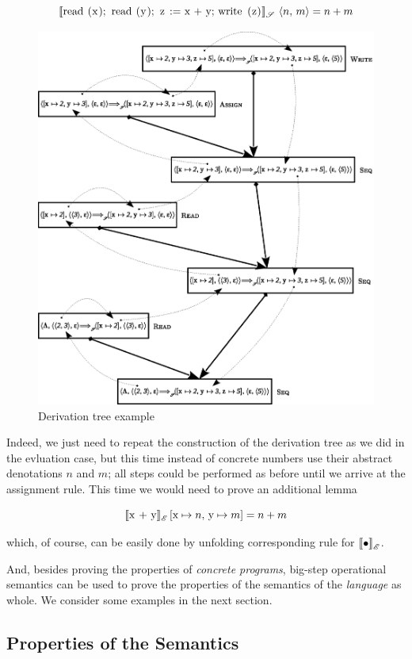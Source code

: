 \[
\sembr{\llang{read (x); read (y); z := x + y; write (z)}}^\ph_\mathscr{S}\,\inbr{n,\,m}=n+m
\]

\begin{figure}[t]
  \centering
  \includegraphics[scale=0.8]{images/03-01.eps}
  \caption{Derivation tree example}
  \label{derivation-tree}
\end{figure}
\FloatBarrier

Indeed, we just need to repeat the construction of the derivation tree as we did in the evluation case, but this time instead of concrete numbers use
their abstract denotations $n$ and $m$; all steps could be performed as before until we arrive at the assignment rule. This time we would need to prove
an additional lemma

\[
\sembr{\llang{x + y}}^\ph_\mathscr{E}\,[\llang{x}\mapsto n,\,\llang{y}\mapsto m]=n+m
\]

which, of course, can be easily done by unfolding corresponding rule for $\sembr{\bullet}^\ph_\mathscr{E}$.

And, besides proving the properties of \emph{concrete programs}, big-step operational semantics can be used to prove the properties
of the semantics of the \emph{language} as whole. We consider some examples in the next section.

\subsection{Properties of the Semantics}






